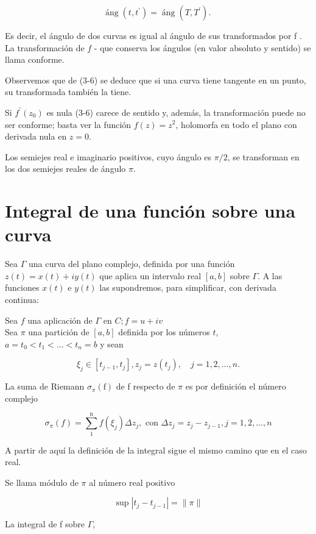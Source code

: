 \documentclass[10pt]{article}
\theoremstyle{plain}
\theoremstyle{definition}
\theoremstyle{remark}
\begin{document}
\begin{equation*}
\operatorname{áng}\left(t, t^{\prime}\right)=\operatorname{áng}\left(T, T^{\prime}\right) \text {. } \tag{3-7}
\end{equation*}


Es decir, el ángulo de dos curvas es igual al ángulo de sus transformados por f . La transformación de $f$ - que conserva los ángulos (en valor absoluto y sentido) se llama conforme.

Observemos que de (3-6) se deduce que si una curva tiene tangente en un punto, su transformada también la tiene.

Si $f^{\prime}\left(z_{0}\right)$ es nula (3-6) carece de sentido y, además, la transformación puede no ser conforme; basta ver la función $f(z)=z^{2}$, holomorfa en todo el plano con derivada nula en $z=0$.

Los semiejes real e imaginario positivos, cuyo ángulo es $\pi / 2$, se transforman en los dos semiejes reales de ángulo $\pi$.

\section{Integral de una función sobre una curva}
Sea $\Gamma$ una curva del plano complejo, definida por una función $z(t)=x(t)+i y(t)$ que aplica un intervalo real $[a, b]$ sobre $\Gamma$. A las funciones $x(t)$ e $y(t)$ las supondremos, para simplificar, con derivada continua:

Sea $f$ una aplicación de $\Gamma$ en $C ; f=u+i v$\\
Sea $\pi$ una partición de $[a, b]$ definida por los números $t$, $a=t_{0}<t_{1}<\ldots<t_{n}=b$ y sean

$$
\xi_{j} \in\left[t_{j-1}, t_{j}\right], z_{j}=z\left(t_{j}\right), \quad j=1,2, \ldots, n .
$$

La suma de Riemann $\sigma_{\pi}(\mathrm{f})$ de f respecto de $\pi$ es por definición el número complejo

$$
\sigma_{\pi}(f)=\sum_{1}^{\mathrm{n}} f\left(\xi_{j}\right) \Delta z_{j}, \text { con } \Delta z_{j}=z_{j}-z_{j-1}, j=1,2, \ldots, n
$$

A partir de aquí la definición de la integral sigue el mismo camino que en el caso real.

Se llama módulo de $\pi$ al número real positivo

$$
\sup \left|t_{j}-t_{j-1}\right|=\|\pi\|
$$

La integral de f sobre $\Gamma$,
\end{document}
